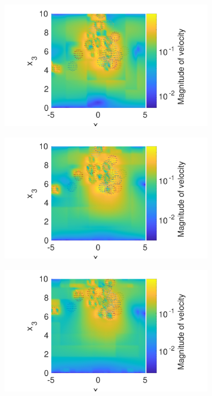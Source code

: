 \begin{figure}
\begin{subfigure}[b]{0.4\textwidth}
    \caption[]{\label{fig:squirmerE}}
\end{subfigure}
\begin{subfigure}[b]{0.4\textwidth}
    \centering
    \includegraphics[width=\textwidth]{Images/squirmers/Gyro-6.pdf}
    \caption[]{\label{fig:squirmerF}}
\end{subfigure}
\begin{subfigure}[b]{0.4\textwidth}
    \centering
    \includegraphics[width=\textwidth]{Images/squirmers/Gyro-7.pdf}
    \caption[]{\label{fig:squirmerG}}
\end{subfigure}
\begin{subfigure}[b]{0.4\textwidth}
    \centering
    \includegraphics[width=\textwidth]{Images/squirmers/Gyro-8.pdf}

\end{subfigure}
\end{figure}
